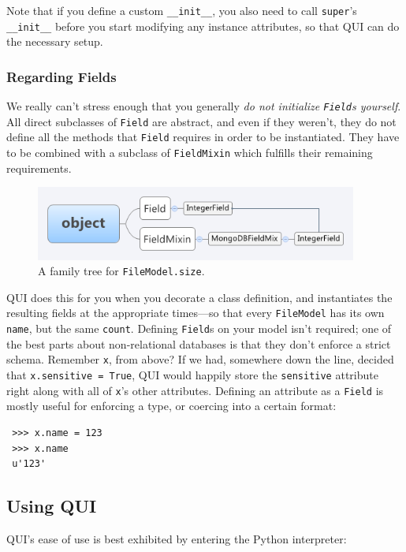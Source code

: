 \documentclass{article} %
\newenvironment{inset}
{
\begin{center}
\begin{minipage}{0.85\textwidth}
}
{
\end{minipage}
\end{center}
}
\newcommand{\il}[1]{\mbox{\lstinline{#1}}}
\begin{document}
Note that if you define a custom \il{__init__}, you also need to call \il{super}'s \il{__init__}  before you start modifying any instance attributes, so that QUI can do the necessary setup.

\subsubsection{Regarding Fields}
We really can't stress enough that you generally \emph{do not initialize \il{Field}s yourself}. All direct subclasses of \il{Field} are abstract, and even if they weren't, they do not define all the methods that \il{Field} requires in order to be instantiated. They have to be combined with a subclass of \il{FieldMixin} which fulfills their remaining requirements.

\begin{figure}[htb]
\centering
\includegraphics[width=400px]{IntegerFieldlInheritanceTreeforFileModel}
\caption{A family tree for \il{FileModel.size}.}
\end{figure}
 QUI does this for you when you decorate a class definition, and instantiates the resulting fields at the appropriate times---so that every \il{FileModel} has its own \il{name}, but the same \il{count}.
Defining \il{Field}s on your model isn't required; one of the best parts about non-relational databases is that they don't enforce a strict schema. Remember \il{x}, from above? If we had,
somewhere down the line, decided that \il{x.sensitive = True}, QUI would happily store the \il{sensitive} attribute right along with all of \il{x}'s other attributes. Defining an attribute as a
\il{Field} is mostly useful for enforcing a type, or coercing into a certain format:
\begin{inset}
\begin{lstlisting}
 >>> x.name = 123
 >>> x.name
 u'123'
\end{lstlisting}
\end{inset}

\subsection{Using QUI}
QUI's ease of use is best exhibited by entering the Python interpreter:
\end{document}
